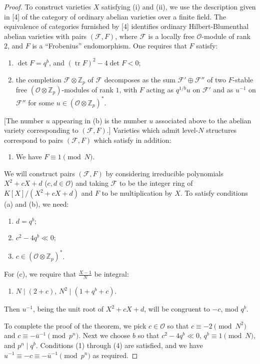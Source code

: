 \documentclass[12pt,a4paper]{article}
\theoremstyle{plain}
\theoremstyle{definition}
\DeclareMathOperator{\tr}{tr}
\newcommand{\OO}{\mathcal{O}}
\newcommand{\Z}{\mathbb{Z}}
\begin{document}
\begin{proof}
To construct varieties $X$ satisfying (i) and (ii), we use the description given in [4] of the category of ordinary abelian varieties over a finite field. The equivalence of categories furnished by [4] identifies ordinary Hilbert-Blumenthal abelian varieties with pairs $(\mathscr{F},F)$, where $\mathscr{F}$ is a locally free $\OO$-module of rank $2$, and $F$ is a ``Frobenius'' endomorphism. One requires that $F$ satisfy:
\begin{enumerate}[label=(\alph*)]
\item $\det F=q^b$, and $(\tr F)^2-4\det F<0$;
\item the completion $\mathscr{F}\otimes\Z_p$ of $\mathscr{F}$ decomposes as the sum $\mathscr{F}'\oplus\mathscr{F}''$ of two $F$-stable free $(\OO\otimes\Z_p)$-modules of rank $1$, with $F$ acting as $q^{1/b}u$ on $\mathscr{F}'$ and as $u^{-1}$ on $\mathscr{F}''$ for some $u\in(\OO\otimes\Z_p)^*$.
\end{enumerate}
[The number $u$ appearing in (b) is the number $u$ associated above to the abelian variety corresponding to $(\mathscr{F},F)$.] Varieties which admit level-$N$ structures correspond to pairs $(\mathscr{F},F)$ which satisfy in addition:
\begin{enumerate}[label=(\alph*),start=3]
\item We have $F\equiv1\pmod{N}$.
\end{enumerate}

We will construct pairs $(\mathscr{F},F)$ by considering irreducible polynomials $X^2+cX+d$ ($c,d\in\OO$) and taking $\mathscr{F}$ to be the integer ring of $K[X]/(X^2+cX+d)$ and $F$ to be multiplication by $X$. To satisfy conditions (a) and (b), we need:
\begin{enumerate}[label=(\arabic*)]
\item $d=q^b$;
\item $c^2-4q^b\ll0$;
\item $c\in(\OO\otimes\Z_p)^*$.
\end{enumerate}
For (c), we require that $\frac{X-1}{N}$ be integral:
\begin{enumerate}[label=(\arabic*),start=4]
\item $N\mid(2+c)$, $N^2\mid(1+q^b+c)$.
\end{enumerate}
Then $u^{-1}$, being the unit root of $X^2+cX+d$, will be congruent to $-c$, mod $q^b$.

To complete the proof of the theorem, we pick $c\in\OO$ so that $c\equiv-2\pmod{N^2}$ and $c\equiv-\bar{u}^{-1}\pmod{p^n}$. Next we choose $b$ so that $c^2-4q^b\ll0$, $q^b\equiv1\pmod{N}$, and $p^n\mid q^b$. Conditions (1) through (4) are satisfied, and we have $u^{-1}\equiv-c\equiv-\bar{u}^{-1}\pmod{p^n}$ as required.
\end{proof}
\end{document}

